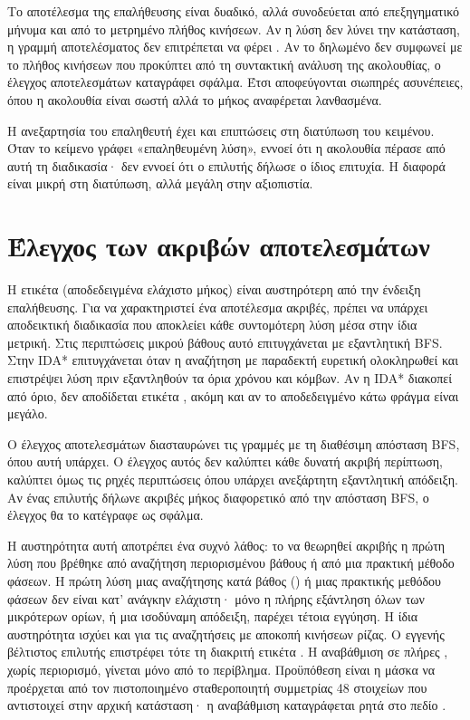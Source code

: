 Το αποτέλεσμα της επαλήθευσης είναι δυαδικό, αλλά συνοδεύεται από επεξηγηματικό μήνυμα και από το μετρημένο πλήθος κινήσεων. Αν η λύση δεν λύνει την κατάσταση, η γραμμή αποτελέσματος δεν επιτρέπεται να φέρει . Αν το δηλωμένο  δεν συμφωνεί με το πλήθος κινήσεων που προκύπτει από τη συντακτική ανάλυση της ακολουθίας, ο έλεγχος αποτελεσμάτων καταγράφει σφάλμα. Έτσι αποφεύγονται σιωπηρές ασυνέπειες, όπου η ακολουθία είναι σωστή αλλά το μήκος αναφέρεται λανθασμένα.

Η ανεξαρτησία του επαληθευτή έχει και επιπτώσεις στη διατύπωση του κειμένου. Όταν το κείμενο γράφει «επαληθευμένη λύση», εννοεί ότι η ακολουθία πέρασε από αυτή τη διαδικασία· δεν εννοεί ότι ο επιλυτής δήλωσε ο ίδιος επιτυχία. Η διαφορά είναι μικρή στη διατύπωση, αλλά μεγάλη στην αξιοπιστία.

\section{Έλεγχος των ακριβών αποτελεσμάτων}
\label{sec:validation-exact}
Η ετικέτα  (αποδεδειγμένα ελάχιστο μήκος) είναι αυστηρότερη από την ένδειξη επαλήθευσης. Για να χαρακτηριστεί ένα αποτέλεσμα ακριβές, πρέπει να υπάρχει αποδεικτική διαδικασία που αποκλείει κάθε συντομότερη λύση μέσα στην ίδια μετρική. Στις περιπτώσεις μικρού βάθους αυτό επιτυγχάνεται με εξαντλητική BFS. Στην IDA* επιτυγχάνεται όταν η αναζήτηση με παραδεκτή ευρετική ολοκληρωθεί και επιστρέψει λύση πριν εξαντληθούν τα όρια χρόνου και κόμβων. Αν η IDA* διακοπεί από όριο, δεν αποδίδεται ετικέτα , ακόμη και αν το αποδεδειγμένο κάτω φράγμα είναι μεγάλο.

Ο έλεγχος αποτελεσμάτων διασταυρώνει τις γραμμές  με τη διαθέσιμη απόσταση BFS, όπου αυτή υπάρχει. Ο έλεγχος αυτός δεν καλύπτει κάθε δυνατή ακριβή περίπτωση, καλύπτει όμως τις ρηχές περιπτώσεις όπου υπάρχει ανεξάρτητη εξαντλητική απόδειξη. Αν ένας επιλυτής δήλωνε ακριβές μήκος διαφορετικό από την απόσταση BFS, ο έλεγχος θα το κατέγραφε ως σφάλμα.

Η αυστηρότητα αυτή αποτρέπει ένα συχνό λάθος: το να θεωρηθεί ακριβής η πρώτη λύση που βρέθηκε από αναζήτηση περιορισμένου βάθους ή από μια πρακτική μέθοδο φάσεων. Η πρώτη λύση μιας αναζήτησης κατά βάθος () ή μιας πρακτικής μεθόδου φάσεων δεν είναι κατ' ανάγκην ελάχιστη· μόνο η πλήρης εξάντληση όλων των μικρότερων ορίων, ή μια ισοδύναμη απόδειξη, παρέχει τέτοια εγγύηση. Η ίδια αυστηρότητα ισχύει και για τις αναζητήσεις με αποκοπή κινήσεων ρίζας. Ο εγγενής βέλτιστος επιλυτής επιστρέφει τότε τη διακριτή ετικέτα . Η αναβάθμιση σε πλήρες , χωρίς περιορισμό, γίνεται μόνο από το περίβλημα. Προϋπόθεση είναι η μάσκα να προέρχεται από τον πιστοποιημένο σταθεροποιητή συμμετρίας 48 στοιχείων που αντιστοιχεί στην αρχική κατάσταση· η αναβάθμιση καταγράφεται ρητά στο πεδίο .


